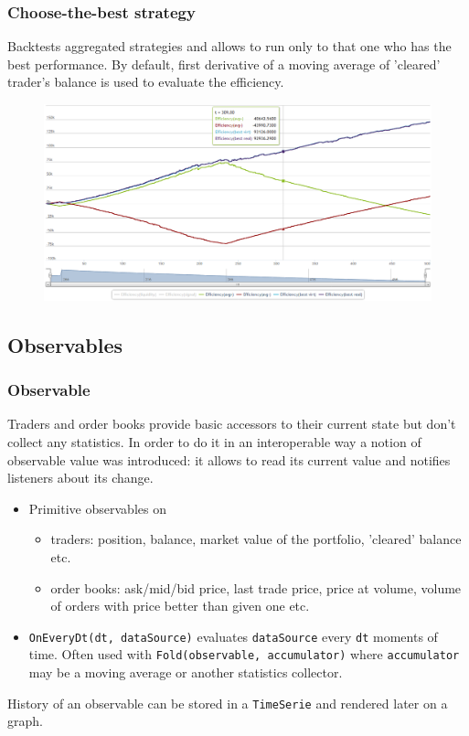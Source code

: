 \documentclass{beamer}
\begin{document}
\begin{frame}
\frametitle{Choose-the-best strategy}
Backtests aggregated strategies and allows to run only to that one who has the best performance. By default, first derivative of a moving average of 'cleared' trader's balance is used to evaluate the efficiency.
\begin{figure}[htbp]
\centering
\includegraphics[width=1\linewidth]{choosethebest.png}
\end{figure}
\end{frame}
\subsection{Observables}
\begin{frame}
\frametitle{Observable}
Traders and order books provide basic accessors to their current state but don't collect any statistics. In order to do it in an interoperable way a notion of observable value was introduced: it allows to read its current value and notifies listeners about its change.
\begin{itemize}
    \item Primitive observables on
    \begin{itemize}
      \item traders: position, balance, market value of the portfolio, 'cleared' balance etc.
      \item order books: ask/mid/bid price, last trade price, price at volume, volume of orders with price better than given one etc.
    \end{itemize}
    \item \texttt{OnEveryDt(dt, dataSource)} evaluates \texttt{dataSource} every \texttt{dt} moments of time. Often used with \texttt{Fold(observable, accumulator)} where \texttt{accumulator} may be a moving average or another statistics collector.
\end{itemize}
History of an observable can be stored in a \texttt{TimeSerie} and rendered later on a graph.
\end{frame}
\end{document}
